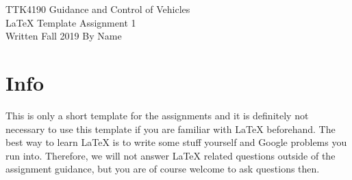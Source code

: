 \documentclass[a4paper]{article}
\begin{document}
\begin{titlepage}
\begin{center}
\Large TTK4190 Guidance and Control of Vehicles \\
\vspace{10pt}
\Large \LaTeX{} Template Assignment 1 \\
\vspace{10pt}
\large Written Fall 2019 By Name
\end{center}
\end{titlepage}

\section*{Info}
This is only a short template for the assignments and it is definitely not necessary to use this template if you are familiar with \LaTeX{} beforehand. The best way to learn \LaTeX{} is to write some stuff yourself and Google problems you run into. Therefore, we will not answer \LaTeX{} related questions outside of the assignment guidance, but you are of course welcome to ask questions then.





\end{document}
